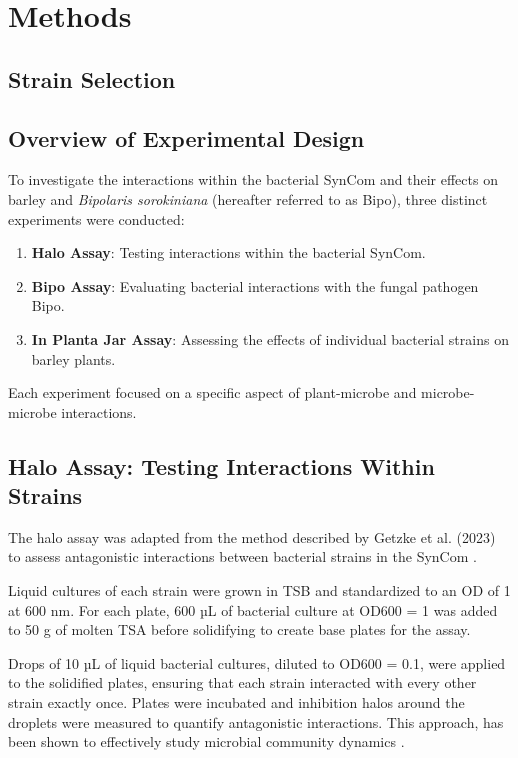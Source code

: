 \section{Methods}

\subsection{Strain Selection}

\subsection{Overview of Experimental Design}
To investigate the interactions within the bacterial \ac{SynCom} and their effects on barley and \textit{Bipolaris sorokiniana} (hereafter referred to as Bipo), three distinct experiments were conducted:
\begin{enumerate}
    \item \textbf{Halo Assay}: Testing interactions within the bacterial \ac{SynCom}.
    \item \textbf{Bipo Assay}: Evaluating bacterial interactions with the fungal pathogen \ac{Bipo}.
    \item \textbf{In Planta Jar Assay}: Assessing the effects of individual bacterial strains on barley plants.
\end{enumerate}
Each experiment focused on a specific aspect of plant-microbe and microbe-microbe interactions.


\subsection{Halo Assay: Testing Interactions Within Strains}
The halo assay was adapted from the method described by Getzke et al. (2023) to assess antagonistic interactions between bacterial strains in the \ac{SynCom} \cite{getzke2023Cofunctioning}. 

Liquid cultures of each strain were grown in \ac{TSB} and standardized to an \ac{OD} of 1 at 600 nm. For each plate, 600 µL of bacterial culture at OD600 = 1 was added to 50 g of molten \ac{TSA} before solidifying to create base plates for the assay.

Drops of 10 µL of liquid bacterial cultures, diluted to OD600 = 0.1, were applied to the solidified plates, ensuring that each strain interacted with every other strain exactly once. Plates were incubated and inhibition halos around the droplets were measured to quantify antagonistic interactions. This approach,  has been shown to effectively study microbial community dynamics \cite{getzke2023Cofunctioning}.


